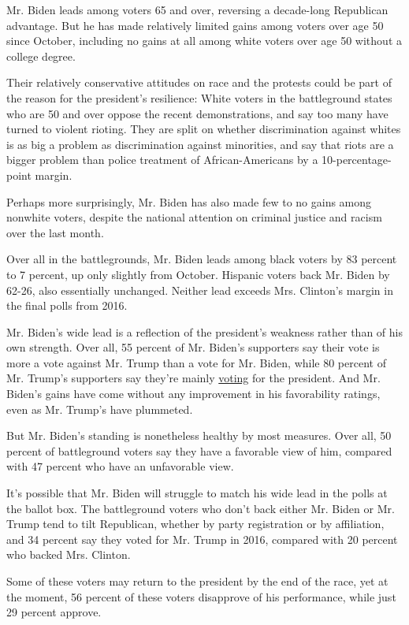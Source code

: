 Mr. Biden leads among voters 65 and over, reversing a decade-long
Republican advantage. But he has made relatively limited gains among
voters over age 50 since October, including no gains at all among white
voters over age 50 without a college degree.

Their relatively conservative attitudes on race and the protests could
be part of the reason for the president's resilience: White voters in
the battleground states who are 50 and over oppose the recent
demonstrations, and say too many have turned to violent rioting. They
are split on whether discrimination against whites is as big a problem
as discrimination against minorities, and say that riots are a bigger
problem than police treatment of African-Americans by a
10-percentage-point margin.

Perhaps more surprisingly, Mr. Biden has also made few to no gains among
nonwhite voters, despite the national attention on criminal justice and
racism over the last month.

Over all in the battlegrounds, Mr. Biden leads among black voters by 83
percent to 7 percent, up only slightly from October. Hispanic voters
back Mr. Biden by 62-26, also essentially unchanged. Neither lead
exceeds Mrs. Clinton's margin in the final polls from 2016.

Mr. Biden's wide lead is a reflection of the president's weakness rather
than of his own strength. Over all, 55 percent of Mr. Biden's supporters
say their vote is more a vote against Mr. Trump than a vote for Mr.
Biden, while 80 percent of Mr. Trump's supporters say they're mainly
\href{https://www.nytimes3xbfgragh.onion/2020/06/27/us/politics/trump-biden-protests-polling.html}{voting}
for the president. And Mr. Biden's gains have come without any
improvement in his favorability ratings, even as Mr. Trump's have
plummeted.

But Mr. Biden's standing is nonetheless healthy by most measures. Over
all, 50 percent of battleground voters say they have a favorable view of
him, compared with 47 percent who have an unfavorable view.

It's possible that Mr. Biden will struggle to match his wide lead in the
polls at the ballot box. The battleground voters who don't back either
Mr. Biden or Mr. Trump tend to tilt Republican, whether by party
registration or by affiliation, and 34 percent say they voted for Mr.
Trump in 2016, compared with 20 percent who backed Mrs. Clinton.

Some of these voters may return to the president by the end of the race,
yet at the moment, 56 percent of these voters disapprove of his
performance, while just 29 percent approve.

